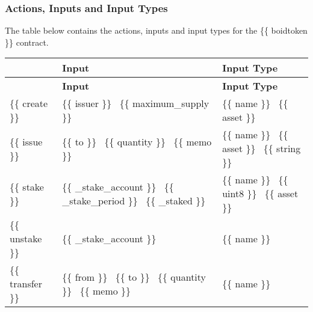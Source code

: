 \subsubsection*{Actions, Inputs and Input Types}

The table below contains the {\ttfamily actions}, {\ttfamily inputs} and {\ttfamily input types} for the {\ttfamily \{\{ boidtoken \}\}} contract.

\tabulinesep=1mm
\begin{longtabu} spread 0pt [c]{*3{|X[-1]}|}
\hline
{}&{\bf Input }&{\bf Input Type  }\\
\endfirsthead
\hline
\endfoot
\hline
{}&{\bf Input }&{\bf Input Type  }\\
\endhead
{\ttfamily \{\{ create \}\}} &{\ttfamily \{\{ issuer \}\}}~\newline
{\ttfamily \{\{ maximum\+\_\+supply \}\}} &{\ttfamily \{\{ name \}\}}~\newline
{\ttfamily \{\{ asset \}\}} \\
{\ttfamily \{\{ issue \}\}} &{\ttfamily \{\{ to \}\}}~\newline
{\ttfamily \{\{ quantity \}\}}~\newline
{\ttfamily \{\{ memo \}\}} &{\ttfamily \{\{ name \}\}}~\newline
{\ttfamily \{\{ asset \}\}}~\newline
{\ttfamily \{\{ string \}\}} \\
{\ttfamily \{\{ stake \}\}} &{\ttfamily \{\{ \+\_\+stake\+\_\+account \}\}}~\newline
{\ttfamily \{\{ \+\_\+stake\+\_\+period \}\}}~\newline
{\ttfamily \{\{ \+\_\+staked \}\}} &{\ttfamily \{\{ name \}\}}~\newline
{\ttfamily \{\{ uint8 \}\}}~\newline
{\ttfamily \{\{ asset \}\}} \\
{\ttfamily \{\{ unstake \}\}} &{\ttfamily \{\{ \+\_\+stake\+\_\+account \}\}} &{\ttfamily \{\{ name \}\}} \\
{\ttfamily \{\{ transfer \}\}} &{\ttfamily \{\{ from \}\}}~\newline
{\ttfamily \{\{ to \}\}}~\newline
{\ttfamily \{\{ quantity \}\}}~\newline
{\ttfamily \{\{ memo \}\}} &{\ttfamily \{\{ name \}\}}~\newline

\end{longtabu}
